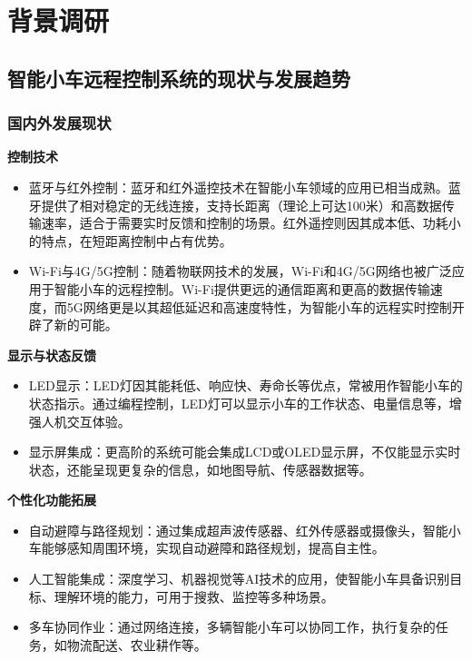 \section{背景调研}
\subsection{智能小车远程控制系统的现状与发展趋势}
\subsubsection{国内外发展现状}

\textbf{控制技术}
\begin{itemize}
    \item 蓝牙与红外控制：蓝牙和红外遥控技术在智能小车领域的应用已相当成熟。蓝牙提供了相对稳定的无线连接，支持长距离（理论上可达100米）和高数据传输速率，适合于需要实时反馈和控制的场景。红外遥控则因其成本低、功耗小的特点，在短距离控制中占有优势。
    \item Wi-Fi与4G/5G控制：随着物联网技术的发展，Wi-Fi和4G/5G网络也被广泛应用于智能小车的远程控制。Wi-Fi提供更远的通信距离和更高的数据传输速度，而5G网络更是以其超低延迟和高速度特性，为智能小车的远程实时控制开辟了新的可能。
\end{itemize}
\textbf{显示与状态反馈}
\begin{itemize}
    \item LED显示：LED灯因其能耗低、响应快、寿命长等优点，常被用作智能小车的状态指示。通过编程控制，LED灯可以显示小车的工作状态、电量信息等，增强人机交互体验。
    \item 显示屏集成：更高阶的系统可能会集成LCD或OLED显示屏，不仅能显示实时状态，还能呈现更复杂的信息，如地图导航、传感器数据等。
\end{itemize}
\textbf{个性化功能拓展}
\begin{itemize}
    \item 自动避障与路径规划：通过集成超声波传感器、红外传感器或摄像头，智能小车能够感知周围环境，实现自动避障和路径规划，提高自主性。
    \item 人工智能集成：深度学习、机器视觉等AI技术的应用，使智能小车具备识别目标、理解环境的能力，可用于搜救、监控等多种场景。
    \item 多车协同作业：通过网络连接，多辆智能小车可以协同工作，执行复杂的任务，如物流配送、农业耕作等。
\end{itemize}
